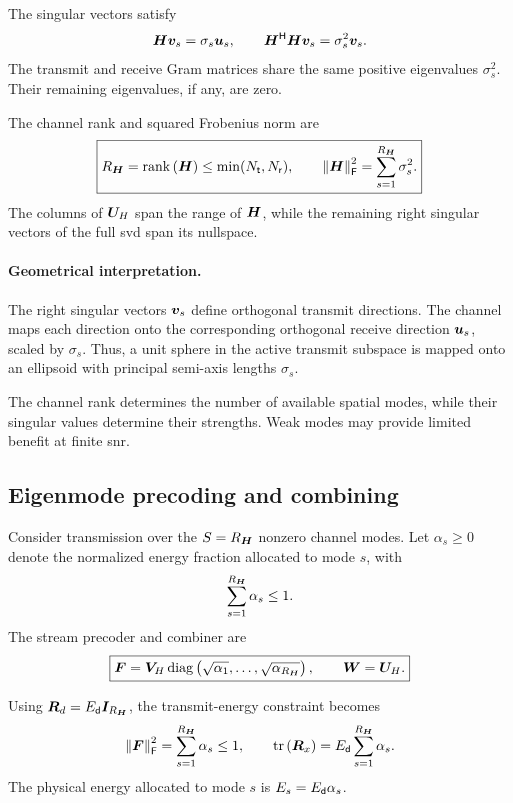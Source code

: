 The singular vectors satisfy
\begin{equation*}
	\bm{H}\bm{v}_s=\sigma_s\bm{u}_s,
	\qquad
	{\bm{H}}^{\mathsf{H}}\bm{H}\bm{v}_s
	=\sigma_s^2\bm{v}_s.
\end{equation*}
The transmit and receive Gram matrices share the same
positive eigenvalues $\sigma_s^2$. Their remaining
eigenvalues, if any, are zero.

The channel rank and squared Frobenius norm are
\begin{equation}\label{eq:svd-rank}
	\boxed{
		R_{\bm{H}}=\operatorname{rank}\left(\bm{H}\right)\leq\min(N_{\mathsf{t}},N_{\mathsf{r}}),
		\qquad
		\left\|\bm{H}\right\|_{\mathsf{F}}^2=\sum_{s=1}^{R_{\bm{H}}}\sigma_s^2.
	}
\end{equation}
The columns of $\bm{U}_{H}$ span the range of $\bm{H}$,
while the remaining right singular vectors of the full
\ac{svd} span its nullspace.

\paragraph{Geometrical interpretation.}
The right singular vectors $\bm{v}_s$ define orthogonal
transmit directions. The channel maps each direction
onto the corresponding orthogonal receive direction
$\bm{u}_s$, scaled by $\sigma_s$.
Thus, a unit sphere in the active transmit subspace
is mapped onto an ellipsoid with principal semi-axis
lengths $\sigma_s$.

The channel rank determines the number of available
spatial modes, while their singular values determine
their strengths. Weak modes may provide limited
benefit at finite \ac{snr}.

\subsection{Eigenmode precoding and combining}

Consider transmission over the $S=R_{\bm{H}}$ nonzero
channel modes. Let $\alpha_s\geq0$ denote the
normalized energy fraction allocated to mode $s$,
with
\[
\sum_{s=1}^{R_{\bm{H}}}\alpha_s\leq1.
\]
The stream precoder and combiner are
\begin{equation}\label{eq:eigenprocessing}
	\boxed{
		\bm{F}
		=\bm{V}_{H}
		\operatorname{diag}\left(\sqrt{\alpha_1},\ldots,\sqrt{\alpha_{R_{\bm{H}}}}\right),
		\qquad
		\bm{W}=\bm{U}_{H}.
	}
\end{equation}

Using $\bm{R}_d=E_{\mathsf{d}}\bm{I}_{R_{\bm{H}}}$, the transmit-energy
constraint becomes
\begin{equation*}
	\left\|\bm{F}\right\|_{\mathsf{F}}^2
	=\sum_{s=1}^{R_{\bm{H}}}\alpha_s\leq1,
	\qquad
	\operatorname{tr}\left(\bm{R}_x\right)
	=E_{\mathsf{d}}\sum_{s=1}^{R_{\bm{H}}}\alpha_s.
\end{equation*}
The physical energy allocated to mode $s$ is
$E_s=E_{\mathsf{d}}\alpha_s$.

